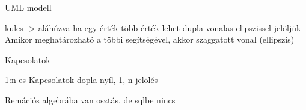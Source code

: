 
UML modell

kulcs -> aláhúzva
ha egy érték több érték lehet dupla vonalas elipszissel jelöljük
Amikor meghatározható a többi segítségével, akkor szaggatott vonal (ellipszis)

Kapcsolatok

1:n es Kapcsolatok
dopla nyíl, 1, n jelölés

Remációs algebrába van osztás, de sqlbe nincs
